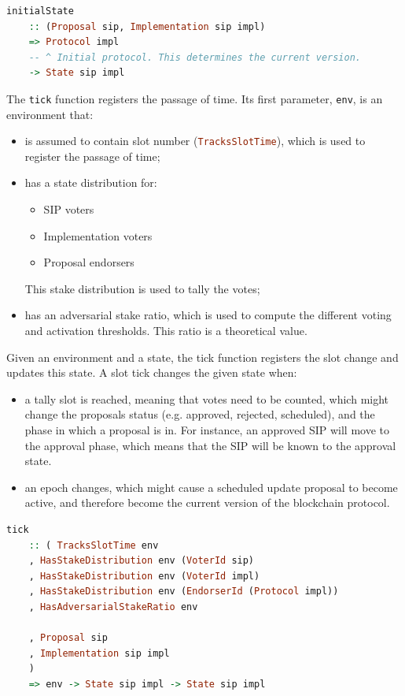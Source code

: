 \begin{lstlisting}[language=Haskell]
	initialState
	:: (Proposal sip, Implementation sip impl)
	=> Protocol impl
	-- ^ Initial protocol. This determines the current version.
	-> State sip impl
\end{lstlisting}

The \lstinline[language=Haskell]!tick! function registers the passage of time. 
Its first
parameter, \lstinline[language=Haskell]!env!, is an environment that:

\begin{itemize}
	\item is assumed to contain slot number 
	(\lstinline[language=Haskell]!TracksSlotTime!), which is
	used to register the passage of time;
	\item has a state distribution for:
	\begin{itemize}
		\item SIP voters
		\item Implementation voters
		\item Proposal endorsers
	\end{itemize}
	This stake distribution is used to tally the votes;
	\item has an adversarial stake ratio, which is used to compute the different
	voting and activation thresholds. This ratio is a theoretical value.
\end{itemize}

Given an environment and a state, the tick function registers the slot change
and updates this state. A slot tick changes the given state when:
\begin{itemize}
	\item a tally slot is reached, meaning that votes need to be counted, which
	might change the proposals status (e.g. approved, rejected, scheduled), and
	the phase in which a proposal is in. For instance, an approved SIP will move
	to the approval phase, which means that the SIP will be known to the 
	approval
	state.
	\item an epoch changes, which might cause a scheduled update proposal to 
	become
	active, and therefore become the current version of the blockchain protocol.
\end{itemize}

\begin{lstlisting}[language=Haskell]
	tick
	:: ( TracksSlotTime env
	, HasStakeDistribution env (VoterId sip)
	, HasStakeDistribution env (VoterId impl)
	, HasStakeDistribution env (EndorserId (Protocol impl))
	, HasAdversarialStakeRatio env
	
	, Proposal sip
	, Implementation sip impl
	)
	=> env -> State sip impl -> State sip impl
\end{lstlisting}

